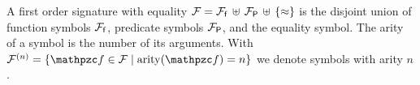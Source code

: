 
\begin{definition}\label{def:signature}
A 
first order 
{\myem signature} with equality
${\mathcal F} = {{\mathcal F}_{\mathsf f}}\,\uplus\,{{\mathcal F}_{\mathsf P}}\,\uplus\,\{\approx\}$ 
is the disjoint union of 
{\myem function symbols} ${{\mathcal F}_{\mathsf f}}$, 
{\myem predicate symbols} ${{\mathcal F}_{\mathsf P}}$,
and the equality symbol.
%
The {\myem arity} of a symbol is the number of its arguments.
With $\mcFn = \{ \mcf\in\mcF \mid \arity(\mcf) = n \}$ we denote symbols with arity $n$.
\end{definition}
